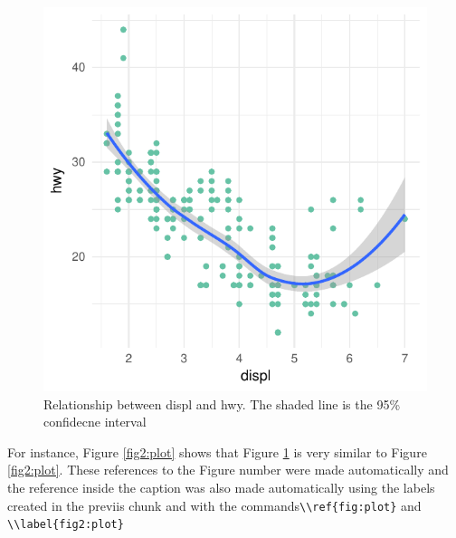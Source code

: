 \documentclass[]{article}
\begin{document}
\begin{figure}
\centering
\includegraphics{manuscript_template_files/figure-latex/carDataPlot-1.pdf}
\caption{Relationship between displ and hwy. The shaded line is the 95\%
confidecne interval \label{fig:plot}}
\end{figure}

For instance, Figure \ref{fig2:plot} shows that Figure \ref{fig:plot} is
very similar to Figure \ref{fig2:plot}. These references to the Figure
number were made automatically and the reference inside the caption was
also made automatically using the labels created in the previis chunk
and with the
commands\texttt{\textbackslash{}\textbackslash{}ref\{fig:plot\}} and
\texttt{\textbackslash{}\textbackslash{}label\{fig2:plot\}}
\end{document}

